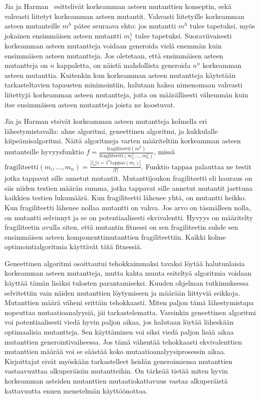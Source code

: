 \documentclass[finnish]{tktltiki2}
\begin{document}
Jia ja Harman~\cite{JiaH08b} esittelivät korkeamman asteen mutanttien konseptin, sekä vahvasti liitetyt korkeamman asteen mutantit. Vahvasti liitetyille korkeamman asteen mutanteille $m^h$ pätee seuraava ehto: jos mutantti $m^h$ tulee tapetuksi, myös jokainen ensimmäisen asteen mutantti $m^1_i$ tulee tapetuksi. Suoraviivaisesti korkeamman asteen mutantteja voidaan generoida vielä enemmän kuin ensimmäisen asteen mutantteja. Jos oletetaan, että ensimmäisen asteen mutantteja on $n$ kappaletta, on näistä mahdollista generoida $n^n$ korkeamman asteen mutanttia. Kuitenkin kun korkeamman asteen mutantteja käytetään tarkasteltavien tapausten minimointiin, halutaan hakea nimenomaan vahvasti liitettyjä korkeamman asteen mutantteja, joita on määrällisesti vähemmän kuin itse ensimmäisen asteen mutantteja joista ne koostuvat. 

Jia ja Harman etsivät korkeamman asteen mutantteja kolmella eri lähestymistavalla: ahne algoritmi, geneettinen algoritmi, ja kukkulalle kiipeämisalgoritmi. Näitä algoritmeja varten määriteltiin korkeamman asteen mutanteille hyvyysfunktio $f = \frac{\text{fragiliteetti}({m^h})}{\text{fragiliteetti}({m^1_1, ..., m^1_n})}$, missä $\text{fragiliteetti}(m_i, ..., m_n) = \frac{|\bigcup{i=1}^{n} \text{tappaa}(m_i)|}{|T|}$. Funktio $\text{tappaa}$ palauttaa ne testit jotka tappavat sille annetut mutantit. Mutanttijoukon fragiliteetti eli hauraus on siis niiden testien määrän summa, jotka tappavat sille annetut mutantit jaettuna kaikkien testien lukumäärä. Kun fragiliteetti lähenee yhtä, on mutantti heikko. Kun fragiliteetti lähenee nollaa mutantti on vahva. Jos arvo on täsmälleen nolla, on mutantti selvinnyt ja se on potentiaalisesti ekvivalentti. Hyvyys on määritelty fragiliteetin avulla siten, että mutantin fitnessi on sen fragiliteetin suhde sen ensimmäisen asteen komponenttimutanttien fragiliteettiin. Kaikki kolme optimointialgoritmia käyttävät tätä fitnessiä. 

Geneettinen algoritmi osoittautui tehokkaimmaksi tavaksi löytää halutunlaisia korkeamman asteen mutantteja, mutta kahta muuta esiteltyä algoritmia voidaan käyttää tämän lisäksi tulosten parantamiseksi. Kuuden ohjelman tutkimuksessa selvitettiin vain näiden mutanttien löytymiseen ja määrään liittyviä seikkoja. Mutanttien määrä väheni erittäin tehokkaasti. Miten paljon tämä lähestymistapa nopeuttaa mutaatioanalyysiä, jäi tarkastelematta. Varsinkin geneettinen algoritmi voi potentiaalisesti viedä hyvin paljon aikaa, jos halutaan löytää läheskään optimaalisia mutantteja. Sen käyttäminen voi siksi viedä paljon lisää aikaa mutanttien generointivaiheessa. Jos tämä vähentää tehokkaasti ekvivalenttien mutanttien määrää voi se säästää koko mutaatioanalyysiprosessin aikaa. Kirjoittajat eivät myöskään tarkastelleet heidän generoimiensa mutanttien vastaavuuttaa alkuperäisiin mutantteihin. On tärkeää tietää miten hyvin korkeamman asteiden mutanttien mutaatiokattavuus vastaa alkuperäistä kattavuutta ennen menetelmän käyttöönottoa.
\end{document}
